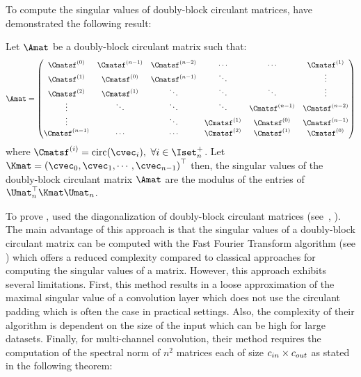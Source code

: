 To compute the singular values of doubly-block circulant matrices, \citet{sedghi2018singular} have demonstrated the following result:
\begin{theorem} \label{theorem:ch3-singular_values_doubly_block_circulant}
  Let $\Amat$ be a doubly-block circulant matrix such that:
  \begin{equation*}
    \Amat = \leftmatrix
      \Cmatsf^{(0)}   & \Cmatsf^{(n-1)} & \Cmatsf^{(n-2)} & \cdots        & \cdots          & \Cmatsf^{(1)}   \\
      \Cmatsf^{(1)}   & \Cmatsf^{(0)}   & \Cmatsf^{(n-1)} & \ddots        &                 & \vdots          \\
      \Cmatsf^{(2)}   & \Cmatsf^{(1)}   & \ddots          & \ddots        & \ddots          & \vdots          \\
      \vdots          & \ddots          & \ddots          & \ddots        & \Cmatsf^{(n-1)} & \Cmatsf^{(n-2)} \\
      \vdots          &                 & \ddots          & \Cmatsf^{(1)} & \Cmatsf^{(0)}   & \Cmatsf^{(n-1)} \\
      \Cmatsf^{(n-1)} & \cdots          & \cdots          & \Cmatsf^{(2)} & \Cmatsf^{(1)}   & \Cmatsf^{(0)}
    \rightmatrix
  \end{equation*}
  where $\Cmatsf^{(i)} = \circulant({\cvec_i}),\ \forall i \in \Iset_n^+$.
  Let $\Kmat = \leftmat \cvec_0, \cvec_1, \cdots, \cvec_{n-1} \rightmat^\top$ then, the singular values of the doubly-block circulant matrix $\Amat$ are the modulus of the entries of $\Umat_n^\top \Kmat \Umat_n$.
\end{theorem}


\noindent
To prove , \citet{sedghi2018singular} used the diagonalization of doubly-block circulant matrices (see~, ).
The main advantage of this approach is that the singular values of a doubly-block circulant matrix can be computed with the Fast Fourier Transform algorithm (see ) which offers a reduced complexity compared to classical approaches for computing the singular values of a matrix.
However, this approach exhibits several limitations.
First, this method results in a loose approximation of the maximal singular value of a convolution layer which does not use the circulant padding which is often the case in practical settings.
Also, the complexity of their algorithm is dependent on the size of the input which can be high for large datasets.
Finally, for multi-channel convolution, their method requires the computation of the spectral norm of $n^2$ matrices each of size $c_{in} \times c_{out}$ as stated in the following theorem:

